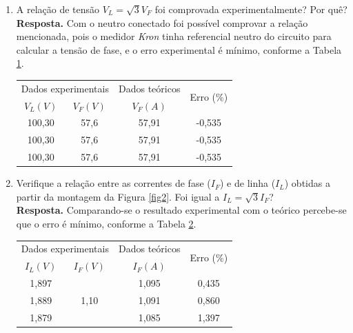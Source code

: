 \documentclass[a4paper,12pt,oneside,openany,table,xcdraw]{article}
\begin{document}
\begin{enumerate}[1)]
 \item A relação de tensão $V_L = \sqrt{3} V_F$ foi comprovada experimentalmente? Por quê?\\
\textbf{Resposta.} Com o neutro conectado foi possível comprovar a relação mencionada, pois o medidor \emph{Kron} tinha referencial neutro do circuito para calcular a tensão de fase, e o erro experimental é mínimo, conforme a Tabela \ref{Erros:tensao}.
 \begin{table}[H]\scriptsize
\centering
\def\arraystretch{1.35}
\captionsetup{font=scriptsize}
 \label{Erros:tensao}

\begin{tabular}{|c|c|c|c|}
\hline
\multicolumn{2}{|c|}{Dados experimentais} & Dados teóricos & \multirow{2}{*}{Erro (\%)} \\ \cline{1-3}
$V_{L} (V)$         & $V_{F} (V)$         & $V_{F} (A)$    &                            \\ \hline
100,30              & 57,6                & 57,91          & -0,535                      \\ \hline
100,30              & 57,6                & 57,91          & -0,535                      \\ \hline
100,30              & 57,6                & 57,91          & -0,535                      \\ \hline
\end{tabular}
\end{table}

 \item Verifique a relação entre as correntes de fase ($I_F$) e de linha ($I_L$) obtidas a partir da
montagem da Figura \ref{fig2}. Foi igual a $I_L = \sqrt{3} I_F$?\\
\textbf{Resposta.} Comparando-se o resultado experimental com o teórico percebe-se que o erro é mínimo, conforme a Tabela \ref{Erros:corrente}.
 \begin{table}[H]\scriptsize
\centering
\def\arraystretch{1.35}
\captionsetup{font=scriptsize}
 \label{Erros:corrente}

\begin{tabular}{|c|c|c|c|}
\hline
\multicolumn{2}{|c|}{Dados experimentais} & Dados teóricos & \multirow{2}{*}{Erro (\%)} \\ \cline{1-3}
$I_{L} (V)$    & $I_{F} (V)$              & $I_{F} (A)$    &                            \\ \hline
1,897          & \multirow{3}{*}{1,10}    & 1,095          & 0,435                      \\ \cline{1-1} \cline{3-4} 
1,889          &                          & 1,091          & 0,860                      \\ \cline{1-1} \cline{3-4} 
1,879          &                          & 1,085          & 1,397                      \\ \hline
\end{tabular}
\end{table}


\end{enumerate}
\end{document}

